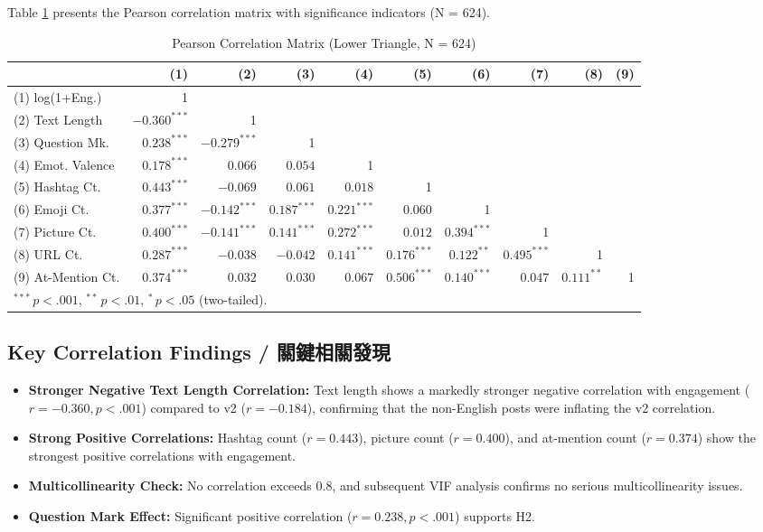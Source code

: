 \documentclass[12pt,a4paper]{article}
\begin{document}
Table \ref{tab:corr_full} presents the Pearson correlation matrix with significance indicators (N = 624).

\begin{table}[H]
\centering
\caption{Pearson Correlation Matrix (Lower Triangle, N = 624)}
\label{tab:corr_full}
\small
\setlength{\tabcolsep}{3pt}
\begin{tabular}{lrrrrrrrrr}
\toprule
 & (1) & (2) & (3) & (4) & (5) & (6) & (7) & (8) & (9) \\
\midrule
(1) log(1+Eng.) & 1 & & & & & & & & \\
(2) Text Length & $-0.360^{***}$ & 1 & & & & & & & \\
(3) Question Mk. & $0.238^{***}$ & $-0.279^{***}$ & 1 & & & & & & \\
(4) Emot. Valence & $0.178^{***}$ & $0.066$ & $0.054$ & 1 & & & & & \\
(5) Hashtag Ct. & $0.443^{***}$ & $-0.069$ & $0.061$ & $0.018$ & 1 & & & & \\
(6) Emoji Ct. & $0.377^{***}$ & $-0.142^{***}$ & $0.187^{***}$ & $0.221^{***}$ & $0.060$ & 1 & & & \\
(7) Picture Ct. & $0.400^{***}$ & $-0.141^{***}$ & $0.141^{***}$ & $0.272^{***}$ & $0.012$ & $0.394^{***}$ & 1 & & \\
(8) URL Ct. & $0.287^{***}$ & $-0.038$ & $-0.042$ & $0.141^{***}$ & $0.176^{***}$ & $0.122^{**}$ & $0.495^{***}$ & 1 & \\
(9) At-Mention Ct. & $0.374^{***}$ & $0.032$ & $0.030$ & $0.067$ & $0.506^{***}$ & $0.140^{***}$ & $0.047$ & $0.111^{**}$ & 1 \\
\bottomrule
\multicolumn{10}{l}{\small $^{***}\,p<.001$,\; $^{**}\,p<.01$,\; $^*\,p<.05$ (two-tailed).} \\
\end{tabular}
\end{table}

\subsection{Key Correlation Findings / 關鍵相關發現}

\begin{itemize}
    \item \textbf{Stronger Negative Text Length Correlation:} Text length shows a markedly stronger negative correlation with engagement ($r = -0.360, p < .001$) compared to v2 ($r = -0.184$), confirming that the non-English posts were inflating the v2 correlation.
    \item \textbf{Strong Positive Correlations:} Hashtag count ($r = 0.443$), picture count ($r = 0.400$), and at-mention count ($r = 0.374$) show the strongest positive correlations with engagement.
    \item \textbf{Multicollinearity Check:} No correlation exceeds 0.8, and subsequent VIF analysis confirms no serious multicollinearity issues.
    \item \textbf{Question Mark Effect:} Significant positive correlation ($r = 0.238, p < .001$) supports H2.
\end{itemize}
\end{document}
